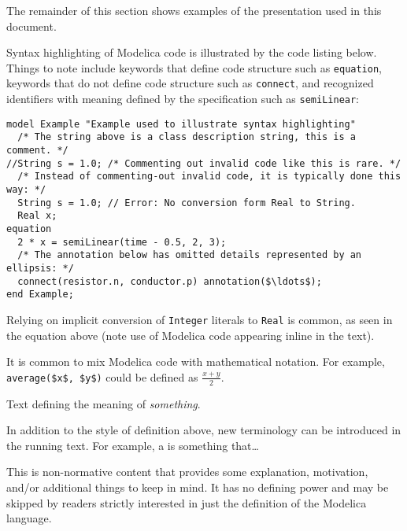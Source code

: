 The remainder of this section shows examples of the presentation used in this document.

Syntax highlighting of Modelica code is illustrated by the code listing below.
Things to note include keywords that define code structure such as \lstinline!equation!, keywords that do not define code structure such as \lstinline!connect!, and recognized identifiers with meaning defined by the specification such as \lstinline!semiLinear!:
\begin{lstlisting}[language=modelica]
model Example "Example used to illustrate syntax highlighting"
  /* The string above is a class description string, this is a comment. */
//String s = 1.0; /* Commenting out invalid code like this is rare. */
  /* Instead of commenting-out invalid code, it is typically done this way: */
  String s = 1.0; // Error: No conversion form Real to String.
  Real x;
equation
  2 * x = semiLinear(time - 0.5, 2, 3);
  /* The annotation below has omitted details represented by an ellipsis: */
  connect(resistor.n, conductor.p) annotation($\ldots$);
end Example;
\end{lstlisting}

Relying on implicit conversion of \lstinline!Integer! literals to \lstinline!Real! is common, as seen in the equation above (note use of Modelica code appearing inline in the text).

It is common to mix Modelica code with mathematical notation.
For example, \lstinline!average($x$, $y$)! could be defined as $\frac{x + y}{2}$.

\begin{definition}[Something]%
Text defining the meaning of \emph{something}.
\end{definition}

In addition to the style of definition above, new terminology can be introduced in the running text.
For example, a  is something that\ldots

\begin{nonnormative}
This is non-normative content that provides some explanation, motivation, and/or additional things to keep in mind.
It has no defining power and may be skipped by readers strictly interested in just the definition of the Modelica language.
\end{nonnormative}

